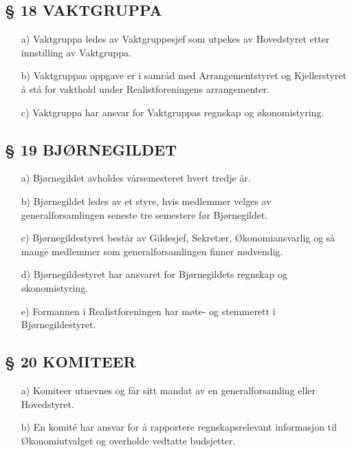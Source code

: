 \subsection*{§ 18 VAKTGRUPPA}

\begin{itemize}
\item[a)] Vaktgruppa ledes av Vaktgruppesjef som utpekes av Hovedstyret etter
innstilling av Vaktgruppa.

\item[b)] Vaktgruppas oppgave er i samråd med Arrangementstyret og
Kjellerstyret å stå for vakthold under Realistforeningens
arrangementer.

\item[c)] Vaktgruppa har ansvar for Vaktgruppas regnskap og økonomistyring.
\end{itemize}


\subsection*{§ 19 BJØRNEGILDET} 

\begin{itemize}
\item[a)] Bjørnegildet avholdes vårsemesteret hvert tredje år. 

\item[b)] Bjørnegildet ledes av et styre, hvis medlemmer velges av
generalforsamlingen seneste tre semestere før Bjørnegildet.

\item[c)] Bjørnegildestyret består av Gildesjef, Sekretær, Økonomiansvarlig
og så mange medlemmer som generalforsamlingen finner nødvendig.

\item[d)] Bjørnegildestyret har ansvaret for Bjørnegildets regnskap og
økonomistyring.

\item[e)] Formannen i Realistforeningen har møte- og stemmerett i
Bjørnegildestyret.
\end{itemize}


\subsection*{§ 20 KOMITEER}

\begin{itemize}
\item[a)] Komiteer utnevnes og får sitt mandat av en generalforsamling eller
Hovedstyret.

\item[b)] En komité har ansvar for å rapportere regnskapsrelevant informasjon til Økonomiutvalget og overholde vedtatte budsjetter.
\end{itemize}


